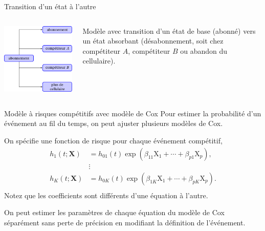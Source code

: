 \documentclass[
  ignorenonframetext,
]{beamer}
\begin{document}
\begin{frame}{Transition d'un état à l'autre}
\protect\hypertarget{transition-dun-uxe9tat-uxe0-lautre}{}
\begin{columns}[T]
\begin{column}{0.6\textwidth}
\includegraphics{figures/transition_etats_modele_risque_competitifs.pdf}
\end{column}

\begin{column}{0.4\textwidth}
Modèle avec transition d'un état de base (abonné) vers un état absorbant
(désabonnement, soit chez compétiteur \(A\), compétiteur \(B\) ou
abandon du cellulaire).
\end{column}
\end{columns}
\end{frame}

\begin{frame}{Modèle à risques compétitifs avec modèle de Cox}
\protect\hypertarget{moduxe8le-uxe0-risques-compuxe9titifs-avec-moduxe8le-de-cox}{}
Pour estimer la probabilité d'un événement au fil du temps, on peut
ajuster plusieurs modèles de Cox.

On spécifie une fonction de risque pour chaque événement compétitif,
\begin{align*}
h_1(t; \mathbf{X})&= h_{01}(t) \exp(\beta_{11}\mathrm{X}_1 + \cdots + \beta_{p1} \mathrm{X}_p),\\
&\vdots\\
h_K(t; \mathbf{X})&= h_{0K}(t) \exp(\beta_{1K}\mathrm{X}_1 + \cdots + \beta_{pK} \mathrm{X}_p).\\
\end{align*} Notez que les coefficients sont différents d'une équation à
l'autre.

On peut estimer les paramètres de chaque équation du modèle de Cox
séparément sans perte de précision en modifiant la définition de
l'événement.
\end{frame}
\end{document}
